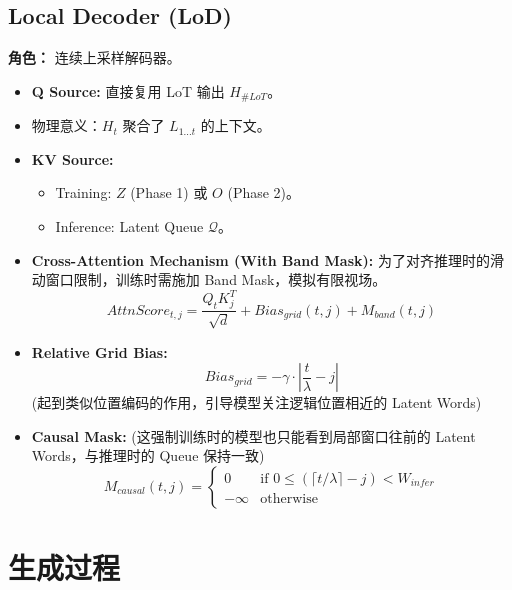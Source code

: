 \documentclass[a4paper,11pt]{article}
\begin{document}
\subsection{Local Decoder (LoD)}
\textbf{角色：} 连续上采样解码器。

\begin{itemize}
    \item \textbf{Q Source:} 直接复用 LoT 输出 $H_{\#LoT}$。
    \item 物理意义：$H_{t}$ 聚合了 $L_{1 \dots t}$ 的上下文。
    \item \textbf{KV Source:}
    \begin{itemize}
        \item Training: $Z$ (Phase 1) 或 $O$ (Phase 2)。
        \item Inference: Latent Queue $\mathcal{Q}$。
    \end{itemize}
    
    \item \textbf{Cross-Attention Mechanism (With Band Mask):}
    为了对齐推理时的滑动窗口限制，训练时需施加 Band Mask，模拟有限视场。
    \begin{equation*}
        AttnScore_{t,j} = \frac{Q_{t}K_{j}^{T}}{\sqrt{d}} + Bias_{grid}(t,j) + M_{band}(t,j)
    \end{equation*}
    
    \item \textbf{Relative Grid Bias:}
    \begin{equation*}
        Bias_{grid} = -\gamma \cdot \left|\frac{t}{\lambda} - j\right|
    \end{equation*}
    (起到类似位置编码的作用，引导模型关注逻辑位置相近的 Latent Words)
    
    \item \textbf{Causal Mask:}
    (这强制训练时的模型也只能看到局部窗口往前的 Latent Words，与推理时的 Queue 保持一致)
    \begin{equation*}
        M_{causal}(t,j) = \begin{cases} 
            0 & \text{if } 0 \le (\lceil t/\lambda \rceil - j) < W_{infer} \\ 
            -\infty & \text{otherwise} 
        \end{cases}
    \end{equation*}
\end{itemize}

\section{生成过程}
\end{document}
